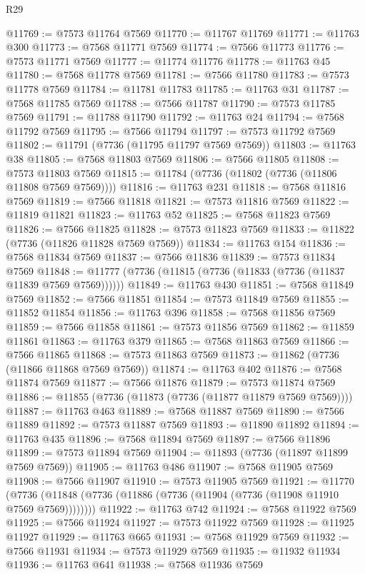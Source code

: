 \begin{lexlean}{R29}
\begin{coremodule}
@11769 := @7573 @11764 @7569
@11770 := @11767 @11769
@11771 := @11763 @300
@11773 := @7568 @11771 @7569
@11774 := @7566 @11773
@11776 := @7573 @11771 @7569
@11777 := @11774 @11776
@11778 := @11763 @45
@11780 := @7568 @11778 @7569
@11781 := @7566 @11780
@11783 := @7573 @11778 @7569
@11784 := @11781 @11783
@11785 := @11763 @31
@11787 := @7568 @11785 @7569
@11788 := @7566 @11787
@11790 := @7573 @11785 @7569
@11791 := @11788 @11790
@11792 := @11763 @24
@11794 := @7568 @11792 @7569
@11795 := @7566 @11794
@11797 := @7573 @11792 @7569
@11802 := @11791 (@7736 (@11795 @11797 @7569 @7569))
@11803 := @11763 @38
@11805 := @7568 @11803 @7569
@11806 := @7566 @11805
@11808 := @7573 @11803 @7569
@11815 := @11784 (@7736 (@11802 (@7736 (@11806 @11808 @7569 @7569))))
@11816 := @11763 @231
@11818 := @7568 @11816 @7569
@11819 := @7566 @11818
@11821 := @7573 @11816 @7569
@11822 := @11819 @11821
@11823 := @11763 @52
@11825 := @7568 @11823 @7569
@11826 := @7566 @11825
@11828 := @7573 @11823 @7569
@11833 := @11822 (@7736 (@11826 @11828 @7569 @7569))
@11834 := @11763 @154
@11836 := @7568 @11834 @7569
@11837 := @7566 @11836
@11839 := @7573 @11834 @7569
@11848 := @11777 (@7736 (@11815 (@7736 (@11833 (@7736 (@11837 @11839 @7569 @7569))))))
@11849 := @11763 @430
@11851 := @7568 @11849 @7569
@11852 := @7566 @11851
@11854 := @7573 @11849 @7569
@11855 := @11852 @11854
@11856 := @11763 @396
@11858 := @7568 @11856 @7569
@11859 := @7566 @11858
@11861 := @7573 @11856 @7569
@11862 := @11859 @11861
@11863 := @11763 @379
@11865 := @7568 @11863 @7569
@11866 := @7566 @11865
@11868 := @7573 @11863 @7569
@11873 := @11862 (@7736 (@11866 @11868 @7569 @7569))
@11874 := @11763 @402
@11876 := @7568 @11874 @7569
@11877 := @7566 @11876
@11879 := @7573 @11874 @7569
@11886 := @11855 (@7736 (@11873 (@7736 (@11877 @11879 @7569 @7569))))
@11887 := @11763 @463
@11889 := @7568 @11887 @7569
@11890 := @7566 @11889
@11892 := @7573 @11887 @7569
@11893 := @11890 @11892
@11894 := @11763 @435
@11896 := @7568 @11894 @7569
@11897 := @7566 @11896
@11899 := @7573 @11894 @7569
@11904 := @11893 (@7736 (@11897 @11899 @7569 @7569))
@11905 := @11763 @486
@11907 := @7568 @11905 @7569
@11908 := @7566 @11907
@11910 := @7573 @11905 @7569
@11921 := @11770
    (@7736 (@11848 (@7736 (@11886 (@7736 (@11904 (@7736 (@11908 @11910 @7569 @7569))))))))
@11922 := @11763 @742
@11924 := @7568 @11922 @7569
@11925 := @7566 @11924
@11927 := @7573 @11922 @7569
@11928 := @11925 @11927
@11929 := @11763 @665
@11931 := @7568 @11929 @7569
@11932 := @7566 @11931
@11934 := @7573 @11929 @7569
@11935 := @11932 @11934
@11936 := @11763 @641
@11938 := @7568 @11936 @7569

\end{coremodule}
\end{lexlean}
